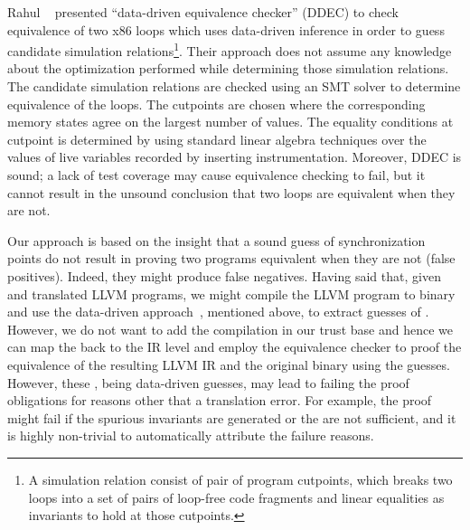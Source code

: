 Rahul \etal~\cite{DDEC:OOPSLA:2013} presented ``data-driven equivalence checker'' (DDEC) to check equivalence of two x86 loops which uses data-driven inference in order to guess candidate simulation relations\footnote{A simulation relation consist of pair of program cutpoints, which breaks two loops into a set of pairs of loop-free code fragments and  linear equalities as invariants to hold at those cutpoints.}. Their approach does not assume any knowledge about the optimization performed while determining those simulation relations. The candidate simulation relations are checked using an SMT solver to determine equivalence of the loops. The cutpoints are chosen where the corresponding memory states agree on the largest number of values. The equality conditions   at cutpoint is determined by using standard linear algebra techniques over the values of live variables recorded by inserting instrumentation. Moreover, DDEC is sound; a lack of test coverage may cause equivalence checking to fail, but it cannot result in the unsound conclusion that two loops are equivalent when they are not.    

Our approach is based on the insight that a sound guess of synchronization
points do not result in proving two programs equivalent when they are not
(false positives). Indeed, they might produce false negatives. Having said
that, given  \ISA and translated LLVM programs, we might compile the LLVM
program to binary and use the data-driven approach~\cite{DDEC:OOPSLA:2013}, mentioned above, to extract guesses of
\syncps. However, we do not want to add the compilation in our
trust base and hence we can map the \syncps back to the IR level
and employ the equivalence checker  to proof the equivalence of the resulting
LLVM IR and the original binary using the \syncp guesses. However, these \syncp, being data-driven guesses, may lead to failing the proof obligations for reasons other that a translation error. For example, the proof might fail if the spurious invariants are generated or the \syncps are not sufficient, and it is highly non-trivial to automatically attribute the failure reasons. 

